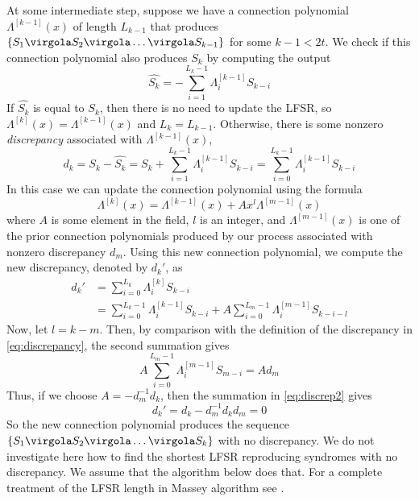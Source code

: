 At some intermediate step, suppose we have a connection polynomial \(\Lambda^{[k-1]}(x)\) of length \(L_{k-1}\) that produces \( \{S_1\virgola S_2\virgola \ldots \virgola S_{k-1} \}\) for some \(k-1 < 2t\). We check if this connection polynomial also produces \(S_k\) by computing the output
\begin{equation}
\hat{S_k} = - \sum_{i = 1}^{L_k-1} {\Lambda_i^{[k-1]} S_{k-i}}
\end{equation}
If \(\hat{S_k}\) is equal to \(S_k\), then there is no need to update the LFSR, so \(\Lambda^{[k]}(x)= \Lambda^{[k-1]}(x)\) and \(L_k=L_{k-1}\). Otherwise, there is some nonzero \emph{discrepancy} associated with \(\Lambda^{[k-1]}(x)\),
\begin{equation} \label{eq:discrepancy}
d_k = S_k - \hat{S_k} = S_k + \sum_{i = 1}^{L_k-1} {\Lambda_i^{[k-1]} S_{k-i}} =
\sum_{i = 0}^{L_k-1} {\Lambda_i^{[k-1]} S_{k-i}}
\end{equation}
In this case we can update the connection polynomial using the formula
\begin{equation}
\Lambda^{[k]}(x) = \Lambda^{[k-1]}(x) + A x^l \Lambda^{[m-1]}(x)
\end{equation}
where \(A\) is some element in the field, \(l\) is an integer, and \(\Lambda^{[m-1]}(x)\) is one of the prior connection polynomials produced by our process associated with nonzero discrepancy \(d_m\).
Using this new connection polynomial, we compute the new discrepancy, denoted by \({d_k}'\), as
\begin{align}
{d_k}' &= \sum_{i = 0}^{L_k} {\Lambda_i^{[k]} S_{k-i}}\\
     &= \sum_{i = 0}^{L_k-1} {\Lambda_i^{[k-1]} S_{k-i}} + A \sum_{i = 0}^{L_m-1} {\Lambda_i^{[m-1]} S_{k-i-l}} \label{eq:discrep2}
\end{align}
Now, let \(l=k-m\). Then, by comparison with the definition of the discrepancy in \eqref{eq:discrepancy}, the second summation gives
\begin{equation}
A \sum_{i = 0}^{L_m-1} {\Lambda_i^{[m-1]} S_{m-i}} = A d_m
\end{equation}
Thus, if we choose \(A=-d_m^{-1}d_k\), then the summation in \eqref{eq:discrep2} gives
\begin{equation}
{d_k}' = d_k -d_m^{-1} d_k d_m = 0
\end{equation}
So the new connection polynomial produces the sequence \( \{S_1\virgola S_2\virgola \ldots \virgola S_{k} \}\) with no discrepancy. We do not investigate here how to find the shortest LFSR reproducing syndromes with no discrepancy. We assume that the algorithm below does that. For a complete treatment of the LFSR length in Massey algorithm see \cite{b:moon}.

